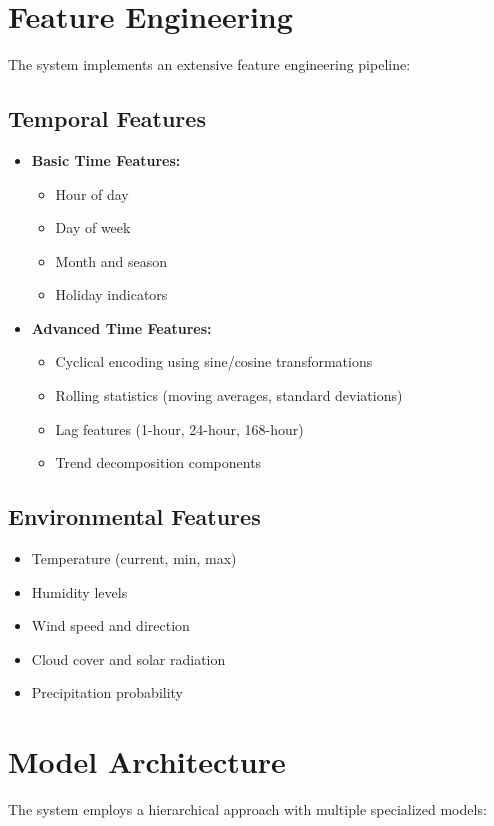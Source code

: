 \documentclass[12pt,a4paper]{report}
\begin{document}
\section{Feature Engineering}
The system implements an extensive feature engineering pipeline:

\subsection{Temporal Features}
\begin{itemize}
\item \textbf{Basic Time Features:}
  \begin{itemize}
    \item Hour of day
    \item Day of week
    \item Month and season
    \item Holiday indicators
  \end{itemize}

\item \textbf{Advanced Time Features:}
  \begin{itemize}
    \item Cyclical encoding using sine/cosine transformations
    \item Rolling statistics (moving averages, standard deviations)
    \item Lag features (1-hour, 24-hour, 168-hour)
    \item Trend decomposition components
  \end{itemize}
\end{itemize}

\subsection{Environmental Features}
\begin{itemize}
\item Temperature (current, min, max)
\item Humidity levels
\item Wind speed and direction
\item Cloud cover and solar radiation
\item Precipitation probability
\end{itemize}

\section{Model Architecture}
The system employs a hierarchical approach with multiple specialized models:
\end{document}
